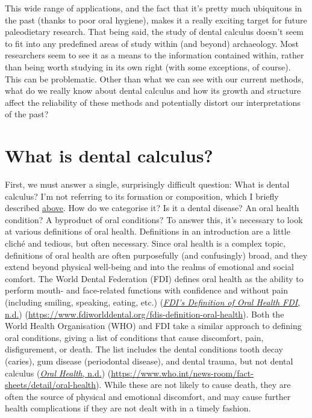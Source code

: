 \documentclass[
  letterpaper,
]{book}
\begin{document}
This wide range of applications, and the fact that it's pretty much
ubiquitous in the past (thanks to poor oral hygiene), makes it a really
exciting target for future paleodietary research. That being said, the
study of dental calculus doesn't seem to fit into any predefined areas
of study within (and beyond) archaeology. Most researchers seem to see
it as a means to the information contained within, rather than being
worth studying in its own right (with some exceptions, of course). This
can be problematic. Other than what we can see with our current methods,
what do we really know about dental calculus and how its growth and
structure affect the reliability of these methods and potentially
distort our interpretations of the past?

\hypertarget{intro-what}{%
\section{What is dental calculus?}\label{intro-what}}

First, we must answer a single, surprisingly difficult question: What is
dental calculus? I'm not referring to its formation or composition,
which I briefly described \protect\hyperlink{intro}{above}. How do we
categorise it? Is it a dental disease? An oral health condition? A
byproduct of oral conditions? To answer this, it's necessary to look at
various definitions of oral health. Definitions in an introduction are a
little cliché and tedious, but often necessary. Since oral health is a
complex topic, definitions of oral health are often purposefully (and
confusingly) broad, and they extend beyond physical well-being and into
the realms of emotional and social comfort. The World Dental Federation
(FDI) defines oral health as the ability to perform mouth- and
face-related functions with confidence and without pain (including
smiling, speaking, eating, etc.)
(\protect\hyperlink{ref-fdiOralHealth}{\emph{{FDI}'s Definition of Oral
Health \textbar{} {FDI}}, n.d.})
(\url{https://www.fdiworlddental.org/fdis-definition-oral-health}). Both
the World Health Organisation (WHO) and FDI take a similar approach to
defining oral conditions, giving a list of conditions that cause
discomfort, pain, disfigurement, or death. The list includes the dental
conditions tooth decay (caries), gum disease (periodontal disease), and
dental trauma, but not dental calculus
(\protect\hyperlink{ref-whoOralHealth}{\emph{Oral Health}, n.d.})
(\url{https://www.who.int/news-room/fact-sheets/detail/oral-health}).
While these are not likely to cause death, they are often the source of
physical and emotional discomfort, and may cause further health
complications if they are not dealt with in a timely fashion.
\end{document}

